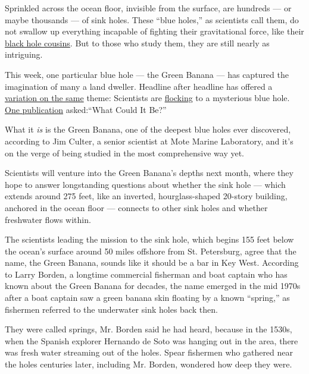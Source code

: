 Sprinkled across the ocean floor, invisible from the surface, are
hundreds --- or maybe thousands --- of sink holes. These ``blue holes,''
as scientists call them, do not swallow up everything incapable of
fighting their gravitational force, like their
\href{https://www.nytimes.com/2019/04/10/science/what-is-black-hole.html}{black
hole cousins}. But to those who study them, they are still nearly as
intriguing.

This week, one particular blue hole --- the Green Banana --- has
captured the imagination of many a land dweller. Headline after headline
has offered a
\href{https://www.google.com/search?client=firefox-b-1-d\&q=blue+hole}{variation
on the same} theme: Scientists are
\href{https://abcnews.go.com/US/scientists-investigate-blue-oceanic-mystery-off-florida-coast/story?id=71919756}{flocking}
to a mysterious blue hole.
\href{https://www.sciencetimes.com/articles/26577/20200723/fishermen-divers-mysterious-blue-hole-florida.htm}{One
publication} asked:``What Could It Be?''

What it \emph{is} is the Green Banana, one of the deepest blue holes
ever discovered, according to Jim Culter, a senior scientist at Mote
Marine Laboratory, and it's on the verge of being studied in the most
comprehensive way yet.

Scientists will venture into the Green Banana's depths next month, where
they hope to answer longstanding questions about whether the sink hole
--- which extends around 275 feet, like an inverted, hourglass-shaped
20-story building, anchored in the ocean floor --- connects to other
sink holes and whether freshwater flows within.

The scientists leading the mission to the sink hole, which begins 155
feet below the ocean's surface around 50 miles offshore from St.
Petersburg, agree that the name, the Green Banana, sounds like it should
be a bar in Key West. According to Larry Borden, a longtime commercial
fisherman and boat captain who has known about the Green Banana for
decades, the name emerged in the mid 1970s after a boat captain saw a
green banana skin floating by a known ``spring,'' as fishermen referred
to the underwater sink holes back then.

They were called springs, Mr. Borden said he had heard, because in the
1530s, when the Spanish explorer Hernando de Soto was hanging out in the
area, there was fresh water streaming out of the holes. Spear fishermen
who gathered near the holes centuries later, including Mr. Borden,
wondered how deep they were.

